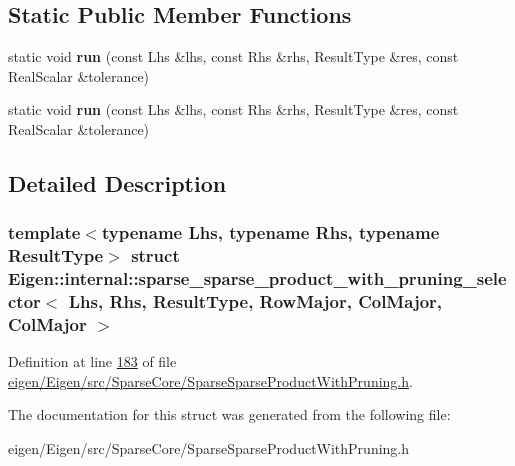 \subsection*{Static Public Member Functions}
\begin{DoxyCompactItemize}
\item 
\mbox{\label{struct_eigen_1_1internal_1_1sparse__sparse__product__with__pruning__selector_3_01_lhs_00_01_rhs_a29c87f6ec217a6cab39d35f96e8e389_a948f5bbd905380e04277416d66bf92f7}} 
static void {\bfseries run} (const Lhs \&lhs, const Rhs \&rhs, Result\+Type \&res, const Real\+Scalar \&tolerance)
\item 
\mbox{\label{struct_eigen_1_1internal_1_1sparse__sparse__product__with__pruning__selector_3_01_lhs_00_01_rhs_a29c87f6ec217a6cab39d35f96e8e389_a948f5bbd905380e04277416d66bf92f7}} 
static void {\bfseries run} (const Lhs \&lhs, const Rhs \&rhs, Result\+Type \&res, const Real\+Scalar \&tolerance)
\end{DoxyCompactItemize}


\subsection{Detailed Description}
\subsubsection*{template$<$typename Lhs, typename Rhs, typename Result\+Type$>$\newline
struct Eigen\+::internal\+::sparse\+\_\+sparse\+\_\+product\+\_\+with\+\_\+pruning\+\_\+selector$<$ Lhs, Rhs, Result\+Type, Row\+Major, Col\+Major, Col\+Major $>$}



Definition at line \hyperlink{eigen_2_eigen_2src_2_sparse_core_2_sparse_sparse_product_with_pruning_8h_source_l00183}{183} of file \hyperlink{eigen_2_eigen_2src_2_sparse_core_2_sparse_sparse_product_with_pruning_8h_source}{eigen/\+Eigen/src/\+Sparse\+Core/\+Sparse\+Sparse\+Product\+With\+Pruning.\+h}.



The documentation for this struct was generated from the following file\+:\begin{DoxyCompactItemize}
\item 
eigen/\+Eigen/src/\+Sparse\+Core/\+Sparse\+Sparse\+Product\+With\+Pruning.\+h\end{DoxyCompactItemize}
